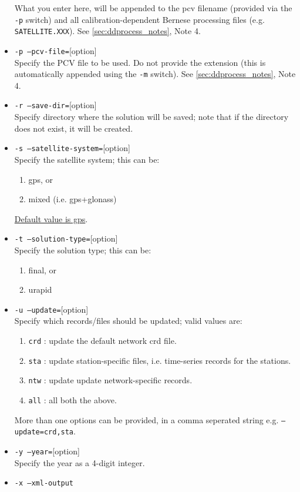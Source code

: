 \begin{itemize}
What you enter here, will be appended to the pcv filename (provided via the \texttt{-p} switch) and all 
calibration-dependent Bernese processing files (e.g. \texttt{SATELLITE.XXX}). 
See \autoref{sec:ddprocess_notes}, Note 4.
\item \texttt{-p --pcv-file=}[option]\\
Specify the PCV file to be used. Do not provide the extension (this is
automatically appended using the \texttt{-m} switch). See \autoref{sec:ddprocess_notes}, Note 4.
\item \texttt{-r --save-dir=}[option]\\
Specify directory where the solution will be saved; note that if the directory does not exist, 
it will be created.
\item \texttt{-s --satellite-system=}[option]\\
Specify the satellite system; this can be:
\begin{enumerate}
\item gps, or
\item mixed (i.e. gps+glonass)
\end{enumerate}
\underline{Default value is gps}.
\item \texttt{-t --solution-type=}[option]\\
Specify the solution type; this can be:
\begin{enumerate}
\item final, or
\item urapid
\end{enumerate}
\item \texttt{-u --update=}[option]\\
Specify which records/files should be updated; valid values are:
\begin{enumerate}
\item \texttt{crd} : update the default network crd file.
\item \texttt{sta} : update station-specific files, i.e. time-series records for the stations.
\item \texttt{ntw} : update update network-specific records.
\item \texttt{all} : all both the above.
\end{enumerate}
More than one options can be provided, in a comma seperated string e.g.
\texttt{--update=crd,sta}.
\item \texttt{-y --year=}[option]\\
Specify the year as a 4-digit integer.
\item \texttt{-x --xml-output}\\

\end{itemize}
